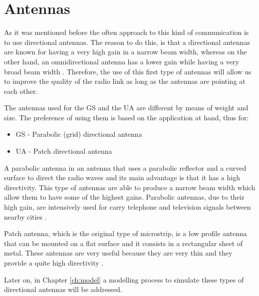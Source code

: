 \section{Antennas}\label{sec:antennas}

As it was mentioned before the often approach to this kind of communication is to use directional antennas.
The reason to do this, is that a directional antennas are known for having a very high gain in a narrow beam width, whereas on the other hand, an omnidirectional antenna has a lower gain while having a very broad beam width \cite{Collin85}.
Therefore, the use of this first type of antennas will allow us to improve the quality of the radio link as long as the antennas are pointing at each other.

The antennas used for the GS and the UA are different by means of weight and size. The preference of using them is based on the application at hand, thus for:
\begin{itemize}
	\item GS - Parabolic (grid) directional antenna 
	\item UA - Patch directional antenna
\end{itemize}

A parabolic antenna in an antenna that uses a parabolic reflector and a curved surface to direct the radio waves and its main advantage is that it has a high directivity. This type of antennas are able to produce a narrow beam width which allow them to have some of the highest gains. Parabolic antennas, due to their high gain, are intensively used for carry telephone and television signals between nearby cities \cite{Collin85}\cite{parabolic}.

Patch antenna, which is the original type of microstrip, is a low profile antenna that can be mounted on a flat surface and it consists in a rectangular sheet of metal. These antennas are very useful because they are very thin and they provide a quite high directivity \cite{Collin85}\cite{patch}.

Later on, in Chapter \ref{ch:model} a modelling process to simulate these types of directional antennas will be addressed.